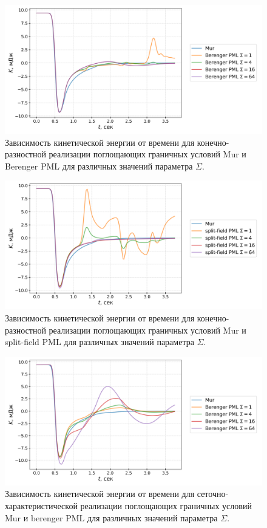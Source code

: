 \begin{figure}[H]
    \centering
    \includegraphics[width=1.0\textwidth]{images/pml/fd_Berenger.png}
    \caption{Зависимость кинетической энергии от времени для конечно-разностной реализации поглощающих граничных условий Mur и Berenger PML для различных значений параметра $\Sigma$.}
    \label{fig:fd_Berenger_pml}
\end{figure}
                                                
\begin{figure}[H]
    \centering
    \includegraphics[width=1.0\textwidth]{images/pml/fd_split-field.png}
    \caption{Зависимость кинетической энергии от времени для конечно-разностной реализации поглощающих граничных условий Mur и split-field PML для различных значений параметра $\Sigma$.}
    \label{fig:fd_split_field_pml}
\end{figure}

\begin{figure}[H]
    \centering
    \includegraphics[width=1.0\textwidth]{images/pml/gcm_Berenger.png}
    \caption{Зависимость кинетической энергии от времени для сеточно-характеристической реализации поглощающих граничных условий Mur и berenger PML для различных значений параметра $\Sigma$.}
    \label{fig:gcm_berenger_pml}
\end{figure}

